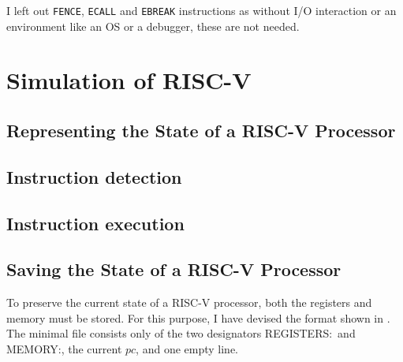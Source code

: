 I left out \texttt{FENCE}, \texttt{ECALL} and \texttt{EBREAK} instructions as
without I/O interaction or an environment like an OS or a debugger, these are
not needed.

\section{Simulation of RISC-V}

\subsection{Representing the State of a RISC-V Processor}
\subsection{Instruction detection}
\subsection{Instruction execution}

\subsection{Saving the State of a RISC-V Processor}\label{sub:statefile}
To preserve the current state of a RISC-V processor, both the registers and
memory must be stored. For this purpose, I have devised the format shown in
. The minimal file consists only of the two designators
\dq REGISTERS:\dq\ and \dq MEMORY:\dq, the current $pc$, and one empty line.
